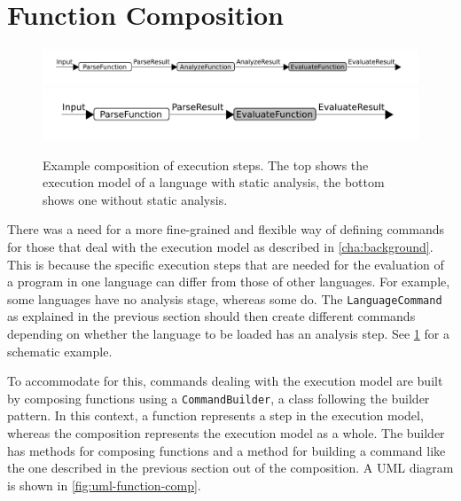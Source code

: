 \makeatletter
\Gscale@div\imgscale\textwidth{\wd0}
\makeatother
%
\section{Function Composition}
\label{sec:function-comp}
\begin{figure}[t]
  \includegraphics[scale=\imgscale]{unit-flow}
  \includegraphics[scale=\imgscale]{unit-flow-no-analyze}
  \caption{Example composition of execution steps. The top shows the
    execution model of a language with static analysis,
    the bottom shows one without static analysis. }
  \label{fig:unit-flow}
\end{figure}

There was a need for a more fine-grained and flexible way of defining commands
for those that deal with the execution model as described in
\cref{cha:background}. This is because the specific
execution steps that are needed for the evaluation of a program in one language
can differ from those of other languages. For example, some languages
have no analysis stage, whereas some do. The \texttt{LanguageCommand} as
explained in the previous section should then create different
commands depending on whether the language to be loaded has an
analysis step. See \cref{fig:unit-flow} for a schematic example.

To accommodate for this, commands dealing with the execution model are
built by composing functions using a \texttt{CommandBuilder}, a class
following the builder pattern. In this context, a function represents a
step in the execution model, whereas the composition represents the
execution model as a whole. The builder has methods for composing
functions and a method for building a command like the one described
in the previous section out of the composition. A UML diagram is shown
in \cref{fig:uml-function-comp}.

